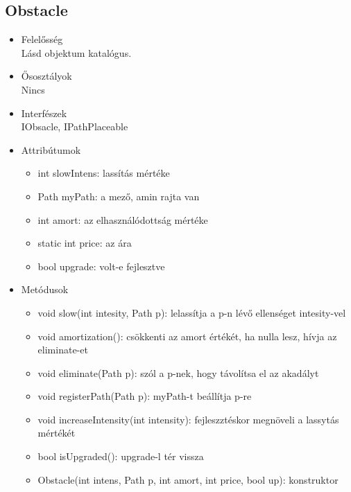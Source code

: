 \subsection{Obstacle}
\begin{itemize}
\item Felelősség\\
Lásd objektum katalógus. 
\item Ősosztályok\\
Nincs
\item Interfészek\\
IObsacle, IPathPlaceable
\item Attribútumok\\
	\begin{itemize}
		\item int slowIntens: lassítás mértéke
		\item Path myPath: a mező, amin rajta van
		\item int amort: az elhasználódottság mértéke
		\item static int price: az ára
		\item bool upgrade: volt-e fejlesztve 
		
	\end{itemize}
\item Metódusok\\
	\begin{itemize}
		
		\item void slow(int intesity, Path p): lelassítja a p-n lévő ellenséget intesity-vel
		\item void amortization(): csökkenti az amort értékét, ha nulla lesz, hívja az eliminate-et
		\item void eliminate(Path p): szól a p-nek, hogy távolítsa el az akadályt
		\item void registerPath(Path p): myPath-t beállítja p-re
		\item void increaseIntensity(int intensity): fejleszztéskor megnöveli a lassytás mértékét
		\item bool isUpgraded(): upgrade-l tér vissza
		\item Obstacle(int intens, Path p, int amort, int price, bool up): konstruktor
		
		
	\end{itemize}
\end{itemize}

